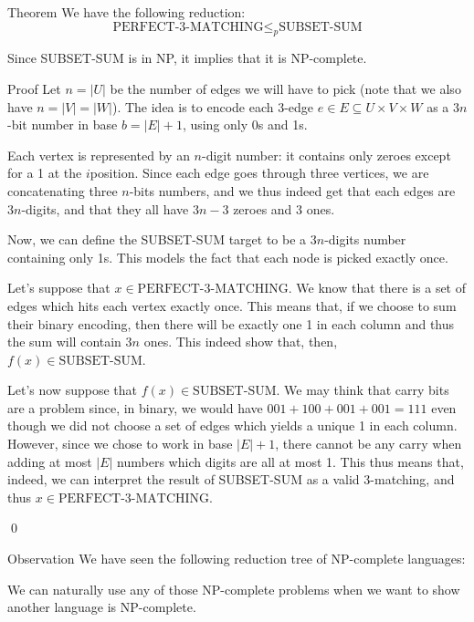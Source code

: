 \documentclass[a4paper]{article}
\begin{document}
\begin{parag}{Theorem}
    We have the following reduction: 
    \[\text{PERFECT-3-MATCHING} \leq_p \text{SUBSET-SUM}\]
    
    Since SUBSET-SUM is in NP, it implies that it is NP-complete.

    \begin{subparag}{Proof}
        Let $n = \left|U\right|$ be the number of edges we will have to pick (note that we also have $n = \left|V\right| = \left|W\right|$). The idea is to encode each 3-edge $e\in E \subseteq U \times V \times W$ as a $3n$-bit number in base $b = \left|E\right| + 1$, using only 0s and 1s.

        Each vertex is represented by an $n$-digit number: it contains only zeroes except for a 1 at the $i$\Th position. Since each edge goes through three vertices, we are concatenating three $n$-bits numbers, and we thus indeed get that each edges are $3n$-digits, and that they all have $3n- 3$ zeroes and $3$ ones. 

        Now, we can define the SUBSET-SUM target to be a $3n$-digits number containing only 1s. This models the fact that each node is picked exactly once.

        Let's suppose that $x \in \text{PERFECT-3-MATCHING}$. We know that there is a set of edges which hits each vertex exactly once. This means that, if we choose to sum their binary encoding, then there will be exactly one 1 in each column and thus the sum will contain $3n$ ones. This indeed show that, then, $f\left(x\right) \in \text{SUBSET-SUM}$.

        Let's now suppose that $f\left(x\right) \in \text{SUBSET-SUM}$. We may think that carry bits are a problem since, in binary, we would have $001 + 100 + 001 + 001 = 111$ even though we did not choose a set of edges which yields a unique 1 in each column. However, since we chose to work in base $\left|E\right| + 1$, there cannot be any carry when adding at most $\left|E\right|$ numbers which digits are all at most 1. This thus means that, indeed, we can interpret the result of SUBSET-SUM as a valid 3-matching, and thus $x \in \text{PERFECT-3-MATCHING}$.

        \qed
    \end{subparag}
\end{parag}


\begin{parag}{Observation}
    We have seen the following reduction tree of NP-complete languages:

    We can naturally use any of those NP-complete problems when we want to show another language is NP-complete.
\end{parag}
\end{document}
